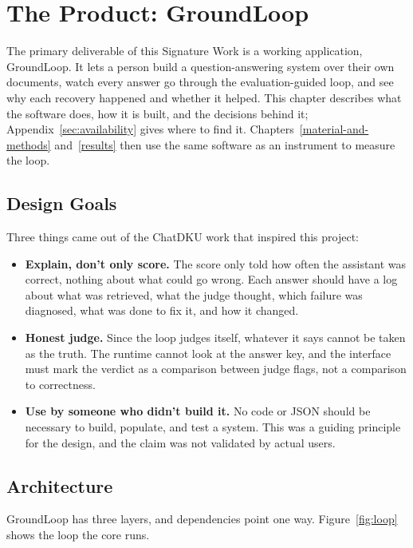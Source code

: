 \documentclass[12pt, a4paper, oneside]{report}
\begin{document}

\chapter{The Product: GroundLoop}
\label{product}

The primary deliverable of this Signature Work is a working application,
GroundLoop. It lets a person build a question-answering system over their
own documents, watch every answer go through the evaluation-guided loop,
and see why each recovery happened and whether it helped. This chapter
describes what the software does, how it is built, and the decisions behind
it; Appendix~\ref{sec:availability} gives where to find it. Chapters~\ref{material-and-methods} and~\ref{results} then use the same
software as an instrument to measure the loop.

\section{Design Goals}

Three things came out of the ChatDKU work that inspired this project:
\begin{itemize}
\item \textbf{Explain, don't only score.} The score only told how often the
  assistant was correct, nothing about what could go wrong. Each answer
  should have a log about what was retrieved, what the judge thought, which
  failure was diagnosed, what was done to fix it, and how it changed.
\item \textbf{Honest judge.} Since the loop judges itself, whatever it says
  cannot be taken as the truth. The runtime cannot look at the answer key,
  and the interface must mark the verdict as a comparison between judge
  flags, not a comparison to correctness.
\item \textbf{Use by someone who didn't build it.} No code or JSON should be
  necessary to build, populate, and test a system. This was a guiding
  principle for the design, and the claim was not validated by actual
  users.
\end{itemize}

\section{Architecture}

GroundLoop has three layers, and dependencies point one way.
Figure~\ref{fig:loop} shows the loop the core runs.
\end{document}
